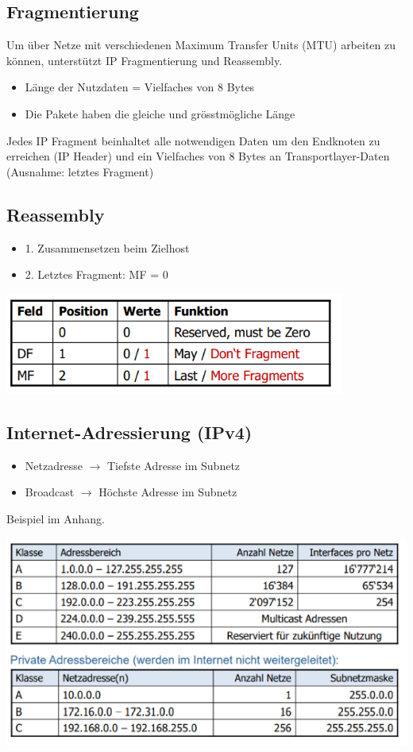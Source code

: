 \subsection{Fragmentierung}{
    Um über Netze mit verschiedenen Maximum Transfer Units (MTU) arbeiten zu können, unterstützt IP
    Fragmentierung und Reassembly.
    \begin{itemize}[noitemsep]
        \item Länge der Nutzdaten = Vielfaches von 8 Bytes
        \item Die Pakete haben die gleiche und grösstmögliche Länge
    \end{itemize}

    Jedes IP Fragment beinhaltet alle notwendigen Daten um den Endknoten zu erreichen (IP Header) und ein
    Vielfaches von 8 Bytes an Transportlayer-Daten (Ausnahme: letztes Fragment)
}

\subsection{Reassembly}{
    \begin{itemize}[noitemsep]
        \item 1. Zusammensetzen beim Zielhost
        \item 2. Letztes Fragment: MF = 0
    \end{itemize}}
\includegraphics[scale=0.5]{img/fragment.png}

\subsection{Internet-Adressierung (IPv4)}{
    \begin{itemize}[noitemsep]
        \item Netzadresse $\to$ Tiefste Adresse im Subnetz
        \item Broadcast $\to$ Höchste Adresse im Subnetz
    \end{itemize}

    Beispiel im Anhang.

    \includegraphics[scale=0.425]{img/netztklassen.png}


}
